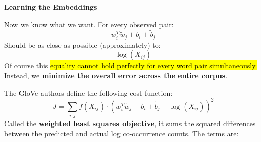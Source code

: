 \highspace
\begin{flushleft}
    \textcolor{Green3}{ \textbf{Learning the Embeddings}}
\end{flushleft}
Now we know what we want. For every observed pair:
\begin{equation*}
    w_i^T \tilde{w}_j + b_i + \tilde{b}_j
\end{equation*}
Should be as close as possible (approximately) to:
\begin{equation*}
    \log \left(X_{ij}\right)
\end{equation*}
Of course this \hl{equality cannot hold perfectly for every word pair simultaneously.} Instead, we \textbf{minimize the overall error across the entire corpus}.

\highspace
The GloVe authors define the following cost function:
\begin{equation}
    J = \sum_{i, j} f\left(X_{ij}\right) \cdot \left(w_i^T \tilde{w}_j + b_i + \tilde{b}_j - \log \left(X_{ij}\right)\right)^{2}
\end{equation}
Called the \textbf{weighted least squares objective}, it sums the squared differences between the predicted and actual log co-occurrence counts. The terms are:
